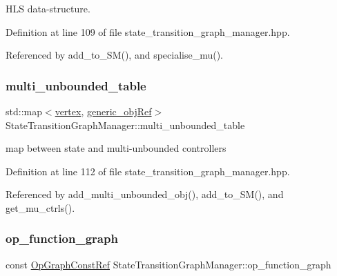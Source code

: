 H\+LS data-\/structure. 



Definition at line 109 of file state\+\_\+transition\+\_\+graph\+\_\+manager.\+hpp.



Referenced by add\+\_\+to\+\_\+\+S\+M(), and specialise\+\_\+mu().

\mbox{\label{classStateTransitionGraphManager_ade73b11f02d845f36315897297c0b0ac}} 
\subsubsection{\texorpdfstring{multi\+\_\+unbounded\+\_\+table}{multi\_unbounded\_table}}
{\footnotesize\ttfamily std\+::map$<$\hyperlink{graph_8hpp_abefdcf0544e601805af44eca032cca14}{vertex}, \hyperlink{generic__obj_8hpp_acb533b2ef8e0fe72e09a04d20904ca81}{generic\+\_\+obj\+Ref}$>$ State\+Transition\+Graph\+Manager\+::multi\+\_\+unbounded\+\_\+table\hspace{0.3cm}{\ttfamily [private]}}



map between state and multi-\/unbounded controllers 



Definition at line 112 of file state\+\_\+transition\+\_\+graph\+\_\+manager.\+hpp.



Referenced by add\+\_\+multi\+\_\+unbounded\+\_\+obj(), add\+\_\+to\+\_\+\+S\+M(), and get\+\_\+mu\+\_\+ctrls().

\mbox{\label{classStateTransitionGraphManager_a6f78fda06b78f88c2ba0575079ee783a}} 
\subsubsection{\texorpdfstring{op\+\_\+function\+\_\+graph}{op\_function\_graph}}
{\footnotesize\ttfamily const \hyperlink{op__graph_8hpp_a9a0b240622c47584bee6951a6f5de746}{Op\+Graph\+Const\+Ref} State\+Transition\+Graph\+Manager\+::op\+\_\+function\+\_\+graph\hspace{0.3cm}{\ttfamily [private]}}



